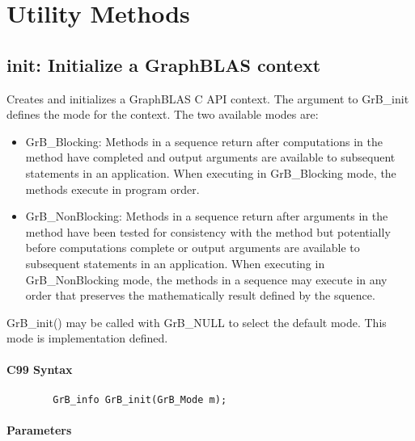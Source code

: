 \section{Utility Methods}


\subsection{{\sf init}: Initialize a GraphBLAS context}

Creates and initializes a GraphBLAS C API context.  The argument
to {\sf GrB\_init} defines the mode for the context.  The two
available modes are:

\begin{itemize}
\item {\sf GrB\_Blocking}: Methods in a sequence return after
computations in the method have completed and output arguments
are available to subsequent statements in an application.  When
executing in {\sf GrB\_Blocking} mode, the methods execute 
in program order.

\item {\sf GrB\_NonBlocking}: Methods in a sequence return after
arguments in the method have been tested for consistency with the
method but potentially before computations complete or output 
arguments are available to subsequent statements in an application.
When executing in {\sf GrB\_NonBlocking} mode, the methods 
in a sequence may execute in any order that preserves the 
mathematically result defined by the squence.

\end{itemize}

{\sf GrB\_init()} may be called with {\sf GrB\_NULL} to select 
the default mode.  This mode is implementation defined.

\paragraph{C99 Syntax}

\begin{verbatim}
        GrB_info GrB_init(GrB_Mode m);
\end{verbatim}


\paragraph{Parameters}

